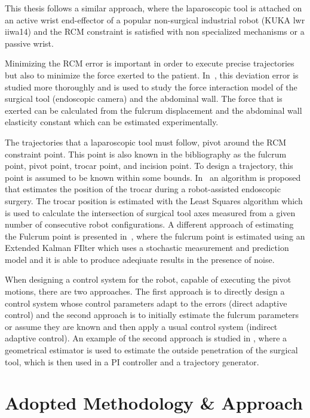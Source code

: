 This thesis follows a similar approach, where the laparoscopic tool is attached on an active wrist end-effector of a popular non-surgical industrial robot (KUKA lwr iiwa14) and the RCM constraint is satisfied with non specialized mechanisms or a passive wrist.

Minimizing the RCM error is important in order to execute precise trajectories but also to minimize the force exerted to the patient. In~\cite{4957177}, this deviation error is studied more thoroughly and is used to study the 
force interaction model of the surgical tool (endoscopic camera) and the abdominal wall. The force that is exerted can be calculated from the fulcrum displacement and the abdominal wall elasticity constant which can be 
estimated experimentally.

The trajectories that a laparoscopic tool must follow, pivot around the RCM constraint point. This point is also known in the bibliography as the fulcrum point, pivot point, trocar point, and incision point. To design a 
trajectory, this point is assumed to be known within some bounds. In~\cite{Dong2016RobustTD} an algorithm is proposed that estimates the position of the trocar during a robot-assisted endoscopic surgery. The trocar position is estimated with the Least Squares algorithm which is used to calculate the intersection of surgical tool axes measured from a given number of consecutive robot configurations. A different approach of estimating the Fulcrum point is presented in~\cite{Gruijthuijsen2018LeveragingTF}, where the fulcrum point is estimated using an Extended Kalman FIlter which uses a stochastic measurement and prediction model and it is able to produce adeqiuate results in the presence of noise.

When designing a control system for the robot, capable of executing the pivot motions, there are two approaches. The first approach is to directly design a control system whose control parameters adapt to the errors (direct 
adaptive control) and the second approach is to initially estimate the fulcrum parameters or assume they are known and then apply a usual control system (indirect adaptive control). An example of the second approach is studied in 
\cite{Muoz2005PivotingMC}, where a geometrical estimator is used to estimate the outside penetration of the surgical tool, which is then used in a PI controller and a trajectory generator.

\section{Adopted Methodology \& Approach}

